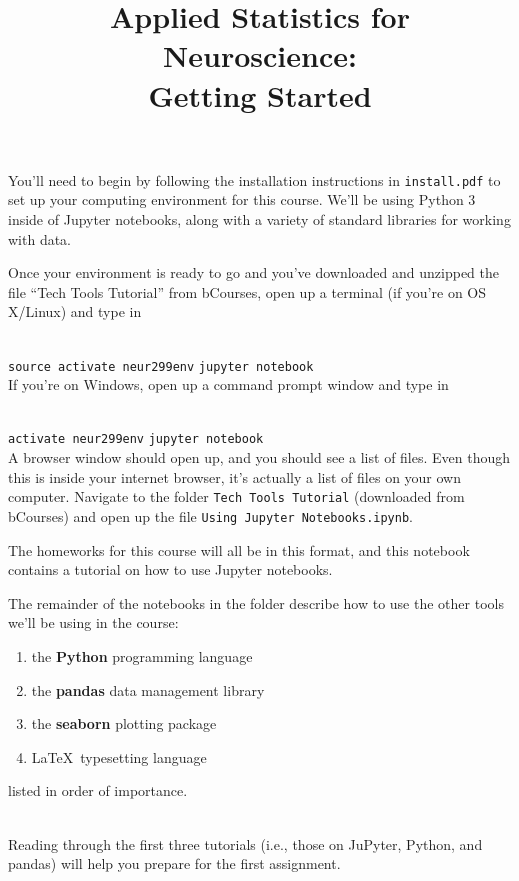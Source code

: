 \documentclass[twoside]{article}
\title{Applied Statistics for Neuroscience:\\
	Getting Started}
\begin{document}
\maketitle

You'll need to begin by following the installation instructions in
\texttt{install.pdf}
to set up your computing environment for this course.
We'll be using Python 3 inside of Jupyter notebooks,
along with a variety of standard libraries for working with data.

Once your environment is ready to go
and you've downloaded and unzipped
the file ``Tech Tools Tutorial'' from bCourses,
open up a terminal (if you're on OS X/Linux)
and type in

\ \\
\texttt{source activate neur299env}
\texttt{jupyter notebook}
\ \\

If you're on Windows, open up a
command prompt window
and type in

\ \\
\texttt{activate neur299env}
\texttt{jupyter notebook}
\ \\

A browser window should open up, and you should see a list of files.
Even though this is inside your internet browser,
it's actually a list of files on your own computer.
Navigate to the folder \texttt{Tech Tools Tutorial}
(downloaded from bCourses)
and open up the file
\texttt{Using Jupyter Notebooks.ipynb}.

The homeworks for this course will all be in this format,
and this notebook contains a tutorial on how to use Jupyter notebooks.

The remainder of the notebooks in the folder describe how
to use the other tools we'll be using in the course:

\begin{enumerate}
\item the \textbf{Python} programming language
\item the \textbf{pandas} data management library
\item the \textbf{seaborn} plotting package
\item \LaTeX \ typesetting language
\end{enumerate}

listed in order of importance.

\ \\

Reading through the first three tutorials
(i.e., those on JuPyter, Python, and pandas)
will help you prepare for the first assignment.
\end{document}
